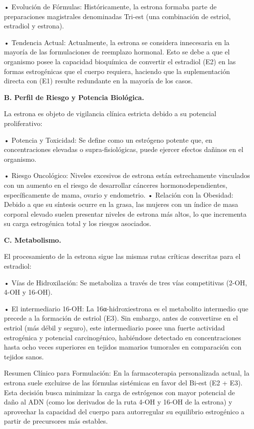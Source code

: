 \documentclass[
  spanish,
]{article}
\begin{document}
• Evolución de Fórmulas: Históricamente, la estrona formaba parte de preparaciones magistrales denominadas Tri-est (una combinación de estriol, estradiol y estrona).

• Tendencia Actual: Actualmente, la estrona se considera innecesaria en la mayoría de las formulaciones de reemplazo hormonal. Esto se debe a que el organismo posee la capacidad bioquímica de convertir el estradiol (E2) en las formas estrogénicas que el cuerpo requiera, haciendo que la suplementación directa con (E1) resulte redundante en la mayoría de los casos.

\textbf{B. Perfil de Riesgo y Potencia Biológica.}

La estrona es objeto de vigilancia clínica estricta debido a su potencial proliferativo:

• Potencia y Toxicidad: Se define como un estrógeno potente que, en concentraciones elevadas o supra-fisiológicas, puede ejercer efectos dañinos en el organismo.

• Riesgo Oncológico: Niveles excesivos de estrona están estrechamente vinculados con un aumento en el riesgo de desarrollar cánceres hormonodependientes, específicamente de mama, ovario y endometrio.
• Relación con la Obesidad: Debido a que su síntesis ocurre en la grasa, las mujeres con un índice de masa corporal elevado suelen presentar niveles de estrona más altos, lo que incrementa su carga estrogénica total y los riesgos asociados.

\textbf{C. Metabolismo.}

El procesamiento de la estrona sigue las mismas rutas críticas descritas para el estradiol:

• Vías de Hidroxilación: Se metaboliza a través de tres vías competitivas (2-OH, 4-OH y 16-OH).

• El intermediario 16-OH: La 16α-hidroxiestrona es el metabolito intermedio que precede a la formación de estriol (E3). Sin embargo, antes de convertirse en el estriol (más débil y seguro), este intermediario posee una fuerte actividad estrogénica y potencial carcinogénico, habiéndose detectado en concentraciones hasta ocho veces superiores en tejidos mamarios tumorales en comparación con tejidos sanos.

Resumen Clínico para Formulación: En la farmacoterapia personalizada actual, la estrona suele excluirse de las fórmulas sistémicas en favor del Bi-est (E2 + E3). Esta decisión busca minimizar la carga de estrógenos con mayor potencial de daño al ADN (como los derivados de la ruta 4-OH y 16-OH de la estrona) y aprovechar la capacidad del cuerpo para autorregular su equilibrio estrogénico a partir de precursores más estables.
\end{document}
